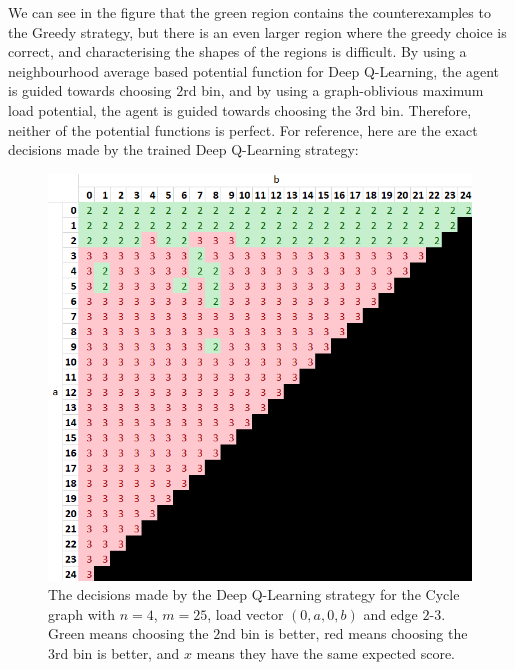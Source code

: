 We can see in the figure that the green region contains the counterexamples to the Greedy strategy, but there is an even larger region where the greedy choice is correct, and characterising the shapes of the regions is difficult. By using a neighbourhood average based potential function for Deep Q-Learning, the agent is guided towards choosing $2$rd bin, and by using a graph-oblivious maximum load potential, the agent is guided towards choosing the $3$rd bin. Therefore, neither of the potential functions is perfect. For reference, here are the exact decisions made by the trained Deep Q-Learning strategy: 


\begin{figure}[hbt!] \label{greedy-counterexample-analysed-for-dqn}
    \centering
    \includegraphics[scale=1.0]{Chapter4/Figs/0a0b_4_25_analysis_dqn.png}
    \caption{The decisions made by the Deep Q-Learning strategy for the Cycle graph with $n=4$, $m=25$, load vector $(0,a,0,b)$ and edge $2$-$3$. Green means choosing the $2$nd bin is better, red means choosing the $3$rd bin is better, and $x$ means they have the same expected score.}
\end{figure}

